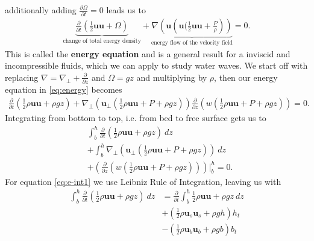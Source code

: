 additionally adding $\frac{\partial \Omega}{\partial t}  =0$ leads us to
\begin{align}
    \underbrace{\frac{\partial }{\partial t} \left(\frac{1}{2}\mathbf{u}\mathbf{u}
    +\Omega\right)}_{\text{change of total energy density}}
    +\underbrace{\nabla \left(\mathbf{u}\left(\mathbf{u}(
    \frac{1}{2}\mathbf{u}\mathbf{u}+\frac{P}{\rho}\right)
\right)}_{\text{energy flow of the velocity field}} = 0.\label{eq:energy}
\end{align}
This is called the \textbf{energy equation} and is a general result for a
inviscid and incompressible fluids, which we can apply to study water waves.
We start off with replacing $\nabla = \nabla_\perp + \frac{\partial }{\partial
z} $ and $\Omega = g z$ and multiplying by $\rho$, then our energy equation
in \ref{eq:energy} becomes
\begin{align}
    \frac{\partial }{\partial t}\left( \frac{1}{2}\rho\mathbf{u}\mathbf{u} + \rho
    g z\right)  + \nabla_\perp\left( \mathbf{u}_\perp\left(
    \frac{1}{2}\rho\mathbf{u}\mathbf{u}+P+\rho gz \right)  \right)
    \frac{\partial}{\partial z} \left( w\left(
    \frac{1}{2}\rho\mathbf{u}\mathbf{u}+P+\rho g z \right)  \right)  = 0.
\end{align}
Integrating from bottom to top, i.e. from bed to free surface gets us to
\begin{align}
    &\int_b^h\frac{\partial }{\partial t}\left( \frac{1}{2}\rho\mathbf{u}\mathbf{u} + \rho
    g z\right)\ dz  \label{eq:e-int1}\\
    &+ \int_b^h \nabla_\perp\left( \mathbf{u}_\perp\left(
    \frac{1}{2}\rho\mathbf{u}\mathbf{u}+P+\rho gz \right)  \right)\
    dz\label{eq:e-int2}\\
    &+ \left(\frac{\partial}{\partial z} \left( w\left(
    \frac{1}{2}\rho\mathbf{u}\mathbf{u}+P+\rho g z \right)
\right)\right)\Bigg|_b^h \label{eq:e-int3}
    = 0.
\end{align}
For equation \ref{eq:e-int1} we use Leibniz Rule of Integration, leaving us
with
\begin{align}
    \int_b^h\frac{\partial }{\partial t}\left( \frac{1}{2}\rho\mathbf{u}\mathbf{u} + \rho
    g z\right)\ dz
    &= \frac{\partial }{\partial t} \int_b^h
    \frac{1}{2}\rho\mathbf{u}\mathbf{u} + \rho gz \ dz\\
    &+ \left( \frac{1}{2}\rho \mathbf{u}_s \mathbf{u}_s  + \rho g h \right)
    h_t\\
    &- \left( \frac{1}{2}\rho \mathbf{u}_b \mathbf{u}_b  + \rho g b \right)
    b_t
\end{align}
